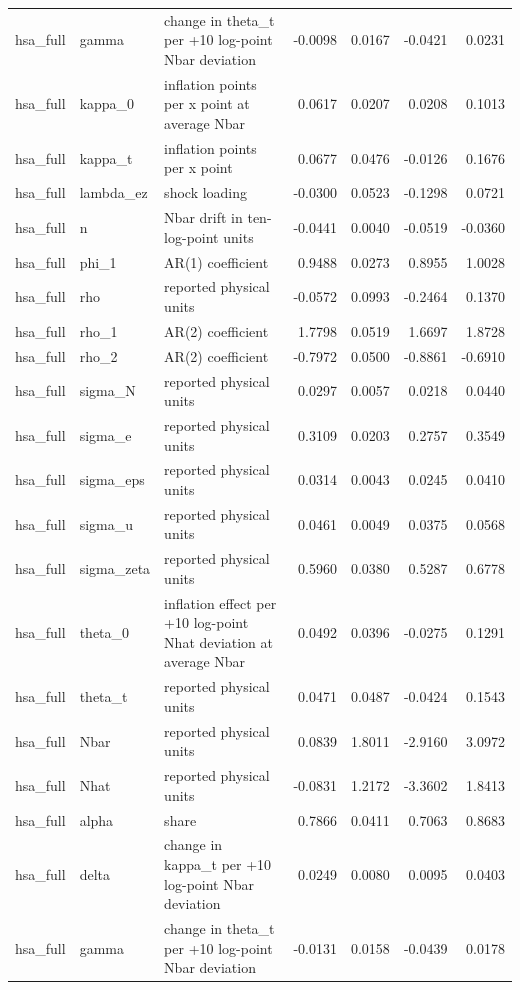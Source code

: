 \begin{tabular}{lllrrrr}
hsa\_full & gamma & change in theta\_t per +10 log-point Nbar deviation & -0.0098 & 0.0167 & -0.0421 & 0.0231 \\
hsa\_full & kappa\_0 & inflation points per x point at average Nbar & 0.0617 & 0.0207 & 0.0208 & 0.1013 \\
hsa\_full & kappa\_t & inflation points per x point & 0.0677 & 0.0476 & -0.0126 & 0.1676 \\
hsa\_full & lambda\_ez & shock loading & -0.0300 & 0.0523 & -0.1298 & 0.0721 \\
hsa\_full & n & Nbar drift in ten-log-point units & -0.0441 & 0.0040 & -0.0519 & -0.0360 \\
hsa\_full & phi\_1 & AR(1) coefficient & 0.9488 & 0.0273 & 0.8955 & 1.0028 \\
hsa\_full & rho & reported physical units & -0.0572 & 0.0993 & -0.2464 & 0.1370 \\
hsa\_full & rho\_1 & AR(2) coefficient & 1.7798 & 0.0519 & 1.6697 & 1.8728 \\
hsa\_full & rho\_2 & AR(2) coefficient & -0.7972 & 0.0500 & -0.8861 & -0.6910 \\
hsa\_full & sigma\_N & reported physical units & 0.0297 & 0.0057 & 0.0218 & 0.0440 \\
hsa\_full & sigma\_e & reported physical units & 0.3109 & 0.0203 & 0.2757 & 0.3549 \\
hsa\_full & sigma\_eps & reported physical units & 0.0314 & 0.0043 & 0.0245 & 0.0410 \\
hsa\_full & sigma\_u & reported physical units & 0.0461 & 0.0049 & 0.0375 & 0.0568 \\
hsa\_full & sigma\_zeta & reported physical units & 0.5960 & 0.0380 & 0.5287 & 0.6778 \\
hsa\_full & theta\_0 & inflation effect per +10 log-point Nhat deviation at average Nbar & 0.0492 & 0.0396 & -0.0275 & 0.1291 \\
hsa\_full & theta\_t & reported physical units & 0.0471 & 0.0487 & -0.0424 & 0.1543 \\
hsa\_full & Nbar & reported physical units & 0.0839 & 1.8011 & -2.9160 & 3.0972 \\
hsa\_full & Nhat & reported physical units & -0.0831 & 1.2172 & -3.3602 & 1.8413 \\
hsa\_full & alpha & share & 0.7866 & 0.0411 & 0.7063 & 0.8683 \\
hsa\_full & delta & change in kappa\_t per +10 log-point Nbar deviation & 0.0249 & 0.0080 & 0.0095 & 0.0403 \\
hsa\_full & gamma & change in theta\_t per +10 log-point Nbar deviation & -0.0131 & 0.0158 & -0.0439 & 0.0178 \\

\end{tabular}
